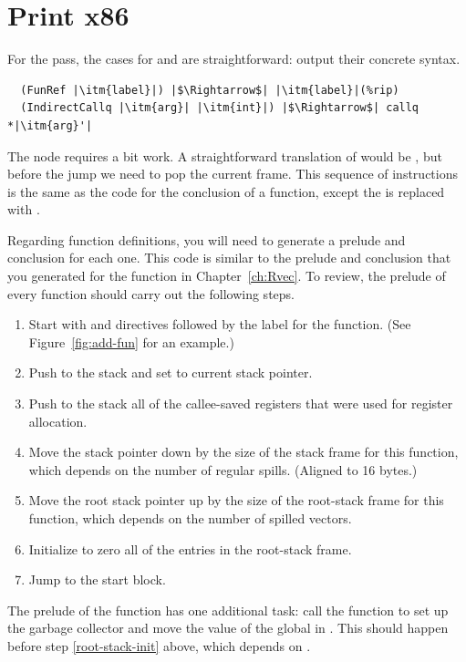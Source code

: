 \documentclass[11pt]{book}
\newcommand{\ocaml}[1]{{\color{blue}{#1}}}
\begin{document}
\section{Print x86}

For the  pass, the cases for  and
 are straightforward: output their concrete
syntax.
\begin{lstlisting}
  (FunRef |\itm{label}|) |$\Rightarrow$| |\itm{label}|(%rip)
  (IndirectCallq |\itm{arg}| |\itm{int}|) |$\Rightarrow$| callq *|\itm{arg}'|
\end{lstlisting}

\ocaml{This paragraph is irrelevant for us.}
The  node requires a bit work. A straightforward
translation of  would be , but
before the jump we need to pop the current frame. This sequence of
instructions is the same as the code for the conclusion of a function,
except the  is replaced with .

Regarding function definitions, you will need to generate a prelude
and conclusion for each one. This code is similar to the prelude and
conclusion that you generated for the  function in
Chapter~\ref{ch:Rvec}. To review, the prelude of every function
should carry out the following steps.
\begin{enumerate}
\item Start with  and  directives followed
  by the label for the function.  (See Figure~\ref{fig:add-fun} for an
  example.)
\item Push  to the stack and set  to current stack
  pointer.
\item Push to the stack all of the callee-saved registers that were
  used for register allocation.
\item Move the stack pointer  down by the size of the stack
  frame for this function, which depends on the number of regular
  spills. (Aligned to 16 bytes.)
\item Move the root stack pointer  up by the size of the
  root-stack frame for this function, which depends on the number of
  spilled vectors. \label{root-stack-init}
\item Initialize to zero all of the entries in the root-stack frame.
\item Jump to the start block.
\end{enumerate}
The prelude of the  function has one additional task: call
the  function to set up the garbage collector and
move the value of the global  in
. This should happen before step \ref{root-stack-init}
above, which depends on .
\end{document}
